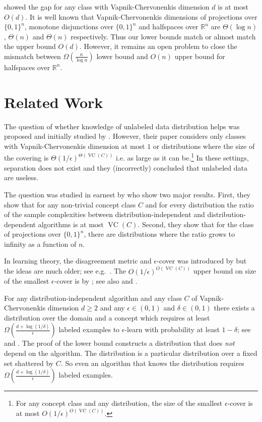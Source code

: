 \documentclass[10pt]{article}
\newcommand{\R}{\mathbb{R}}
\DeclareMathOperator{\VC}{VC}
\begin{document}
\cite{Darnstadt-Simon-Szorenyi-2013} showed the gap for any class with
Vapnik-Chervonenkis dimension $d$ is at most $O(d)$. It is well known that
Vapnik-Chervonenkis dimensions of projections over $\{0,1\}^n$, monotone
disjunctions over $\{0,1\}^n$ and halfspaces over $\R^n$ are $\Theta(\log n)$,
$\Theta(n)$ and $\Theta(n)$ respectively. Thus our lower bounds match or almost
match the upper bound $O(d)$. However, it remains an open problem to close the
mismatch between $\Omega(\frac{n}{\log n})$ lower bound and $O(n)$ upper bound
for halfspaces over $\R^n$.

\section{Related Work}

The question of whether knowledge of unlabeled data distribution helps was
proposed and initially studied by \cite{Ben-David-Lu-Pal-2008}. However, their
paper considers only classes with Vapnik-Chervonenkis dimension at most $1$
or distributions where the size of the covering is
$\Theta(1/\epsilon)^{\Theta(\VC(C))}$ i.e. as large as it can be.\footnote{For
any concept class and any distribution, the size of the smallest
$\epsilon$-cover is at most $O(1/\epsilon)^{O(\VC(C))}$.} In these settings,
separation does not exist and they (incorrectly) concluded that unlabeled data
are useless.

The question was studied in earnest by \cite{Darnstadt-Simon-Szorenyi-2013} who
show two major results. First, they show that for any non-trivial concept class
$C$ and for every distribution the ratio of the sample complexities between
distribution-independent and distribution-dependent algorithms is at most
$\VC(C)$. Second, they show that for the class of projections over $\{0,1\}^n$,
there are distributions where the ratio grows to infinity as a function of $n$.

In learning theory, the disagreement metric and $\epsilon$-cover was  introduced
by \cite{Benedek-Itai-1991} but the ideas are much older; see
e.g.~\cite{Dudley-1978, Dudley-1984}. The $O(1/\epsilon)^{O(\VC(C))}$ upper
bound on size of the smallest $\epsilon$-cover is by \citet[Lemma
7.13]{Dudley-1978}; see also \citet[Chapter 4]{Devroye-Lugosi-2000} and
\cite{Haussler-1995}.

For any distribution-independent algorithm and any class $C$ of
Vapnik-Chervonenkis dimension $d \ge 2$ and any $\epsilon \in (0,1)$ and $\delta
\in (0,1)$ there exists a distribution over the domain and a concept which
requires at least $\Omega \left(\frac{d + \log(1/\delta)}{\epsilon}\right)$
labeled examples to $\epsilon$-learn with probability at least $1 - \delta$;
see~\cite[Theorem 5.3]{Anthony-Bartlett-1999} and
\cite{Blumer-Ehrenfeucht-Haussler-Warmuth-1989,
Ehrenfeucht-Haussler-Kearns-Valiant-1989}. The proof of the lower bound
constructs a distribution that does \emph{not} depend on the algorithm. The
distribution is a particular distribution over a fixed set shattered by $C$. So
even an algorithm that knows the distribution requires $\Omega \left(\frac{d +
\log(1/\delta)}{\epsilon}\right)$ labeled examples.
\end{document}
